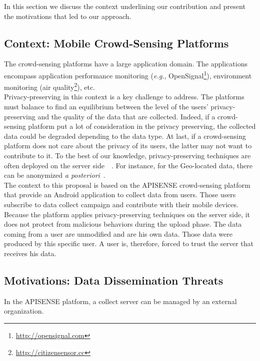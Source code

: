 

In this section we discuss the context underlining our contribution and present the motivations that led to our approach.

\subsection{Context: Mobile Crowd-Sensing Platforms}

The crowd-sensing platforms have a large application domain.
The applications encompass application performance monitoring (\emph{e.g.}, OpenSignal\footnote{\url{http://opensignal.com}}), environment monitoring (air quality\footnote{\url{http://citizensensor.cc}}), etc.
\\

Privacy-preserving in this context is a key challenge to address.
The platforms must balance to find an equilibrium between the level of the users' privacy-preserving and the quality of the data that are collected.
Indeed, if a crowd-sensing platform put a lot of consideration in the privacy preserving, the collected data could be degraded depending to the data type.
At last, if a crowd-sensing platform does not care about the privacy of its users, the latter may not want to contribute to it.
To the best of our knowledge, privacy-preserving techniques are often deployed on the server side~\cite{DBLP:conf/mobisys/CorneliusKKPST08}~\cite{DBLP:conf/dais/HadererRS13}.
For instance, for the Geo-located data, there can be anonymized \emph{a posteriori}~\cite{DBLP:conf/icdcs/PrimaultMB15}.
\\

The context to this proposal is based on the APISENSE crowd-sensing platform that provide an Android application to collect data from users.
Those users subscribe to data collect campaign and contribute with their mobile devices.
Because the platform applies privacy-preserving techniques on the server side, it does not protect from malicious behaviors during the upload phase.
The data coming from a user are unmodified and are his own data.
Those data were produced by this specific user.
A user is, therefore, forced to trust the server that receives his data.

\subsection{Motivations: Data Dissemination Threats}

In the APISENSE platform, a collect server can be managed by an external organization.
\\

